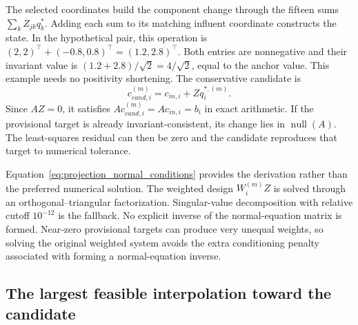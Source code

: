 The selected coordinates build the component change through the fifteen sums $\sum_kZ_{jk}q_k^*$. Adding each sum to its matching influent coordinate constructs the state. In the hypothetical pair, this operation is $(2,2)^\top+(-0.8,0.8)^\top=(1.2,2.8)^\top$. Both entries are nonnegative and their invariant value is $(1.2+2.8)/\sqrt2=4/\sqrt2$, equal to the anchor value. This example needs no positivity shortening. The conservative candidate is
\begin{equation}
c_{cand,i}^{(m)}=c_{in,i}+Zq_i^{*,(m)}.
\label{eq:projection_conservative_candidate}
\end{equation}
Since $AZ=0$, it satisfies $Ac_{cand,i}^{(m)}=Ac_{in,i}=b_i$ in exact arithmetic. If the provisional target is already invariant-consistent, its change lies in $\operatorname{null}(A)$. The least-squares residual can then be zero and the candidate reproduces that target to numerical tolerance.

Equation~\eqref{eq:projection_normal_conditions} provides the derivation rather than the preferred numerical solution. The weighted design $W_i^{(m)}Z$ is solved through an orthogonal--triangular factorization. Singular-value decomposition with relative cutoff $10^{-12}$ is the fallback. No explicit inverse of the normal-equation matrix is formed. Near-zero provisional targets can produce very unequal weights, so solving the original weighted system avoids the extra conditioning penalty associated with forming a normal-equation inverse.

\subsection{The largest feasible interpolation toward the candidate}

